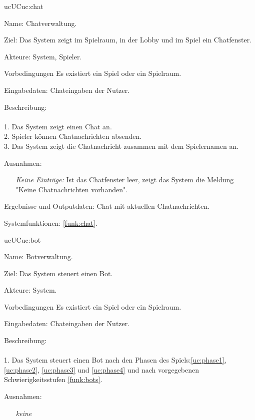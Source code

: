 \begin{description}[leftmargin=5em, style=sameline]
	\begin{lhp}{uc}{UC}{uc:chat}
		\item [Name:] Chatverwaltung.
		\item [Ziel:] Das System zeigt im Spielraum, in der Lobby und im Spiel ein Chatfenster.
		\item [Akteure:] System, Spieler.
		\item [Vorbedingungen] Es existiert ein Spiel oder ein Spielraum.
		\item [Eingabedaten:] Chateingaben der Nutzer.
		\item [Beschreibung:] \hfill\\ \hfill\\
			1. Das System zeigt einen Chat an.\\
			2. Spieler können Chatnachrichten absenden.\\
			3. Das System zeigt die Chatnachricht zusammen mit dem Spielernamen an.\\
		\item [Ausnahmen:] \hfill
				\begin{itemize} 
					\item[] \textit{Keine Einträge:} Ist das Chatfenster leer, zeigt das System die Meldung "{}Keine Chatnachrichten vorhanden{}"{}.
					
				\end{itemize}
		\item [Ergebnisse und Outputdaten:] Chat mit aktuellen Chatnachrichten.	
		\item [Systemfunktionen:] \ref{funk:chat}.
	\end{lhp}

	\begin{lhp}{uc}{UC}{uc:bot}
		\item [Name:] Botverwaltung.
		\item [Ziel:] Das System steuert einen Bot.
		\item [Akteure:] System.
		\item [Vorbedingungen] Es existiert ein Spiel oder ein Spielraum.
		\item [Eingabedaten:] Chateingaben der Nutzer.
		\item [Beschreibung:] \hfill\\ \hfill\\
			1. Das System steuert einen Bot nach den Phasen des Spiels:\ref{uc:phase1},\ref{uc:phase2}, \ref{uc:phase3} und \ref{uc:phase4} und nach vorgegebenen Schwierigkeitsstufen \ref{funk:bots}.\\
		\item [Ausnahmen:] \hfill
			\begin{itemize} 
				\item[] \textit{keine} 
				

\end{itemize}
\end{lhp}
\end{description}
